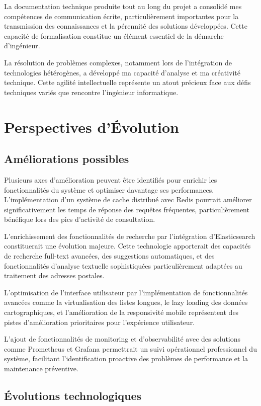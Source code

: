 La documentation technique produite tout au long du projet a consolidé mes compétences de communication écrite, particulièrement importantes pour la transmission des connaissances et la pérennité des solutions développées. Cette capacité de formalisation constitue un élément essentiel de la démarche d'ingénieur.

La résolution de problèmes complexes, notamment lors de l'intégration de technologies hétérogènes, a développé ma capacité d'analyse et ma créativité technique. Cette agilité intellectuelle représente un atout précieux face aux défis techniques variés que rencontre l'ingénieur informatique.

\section{Perspectives d'Évolution}

\subsection{Améliorations possibles}

Plusieurs axes d'amélioration peuvent être identifiés pour enrichir les fonctionnalités du système et optimiser davantage ses performances. L'implémentation d'un système de cache distribué avec Redis pourrait améliorer significativement les temps de réponse des requêtes fréquentes, particulièrement bénéfique lors des pics d'activité de consultation.

L'enrichissement des fonctionnalités de recherche par l'intégration d'Elasticsearch constituerait une évolution majeure. Cette technologie apporterait des capacités de recherche full-text avancées, des suggestions automatiques, et des fonctionnalités d'analyse textuelle sophistiquées particulièrement adaptées au traitement des adresses postales.

L'optimisation de l'interface utilisateur par l'implémentation de fonctionnalités avancées comme la virtualisation des listes longues, le lazy loading des données cartographiques, et l'amélioration de la responsivité mobile représentent des pistes d'amélioration prioritaires pour l'expérience utilisateur.

L'ajout de fonctionnalités de monitoring et d'observabilité avec des solutions comme Prometheus et Grafana permettrait un suivi opérationnel professionnel du système, facilitant l'identification proactive des problèmes de performance et la maintenance préventive.

\subsection{Évolutions technologiques}

